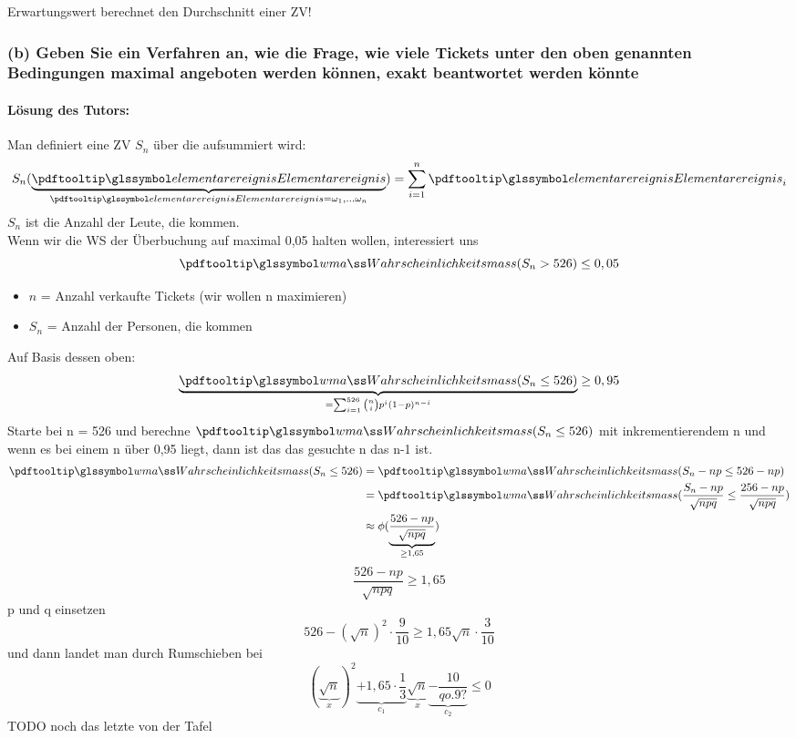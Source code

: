 Erwartungswert berechnet den Durchschnitt einer ZV!

\begin{auf}
    \subsubsection*{(b) Geben Sie ein Verfahren an, wie die Frage, wie viele Tickets unter den oben genannten
    Bedingungen maximal angeboten werden können, exakt beantwortet werden könnte}
    \paragraph{Lösung des Tutors:} Man definiert eine ZV $S_n$ über die aufsummiert wird:
    \[
        S_n( \underbrace{\ele}_{\ele = \omega_1, ... \omega_n}) = \sum^n_{i=1} \ele_i
    \]
    $S_n$ ist die Anzahl der Leute, die kommen. \\
    Wenn wir die WS der Überbuchung auf maximal 0,05 halten wollen, interessiert uns
    \[
        \pe( S_n > 526 ) \leq 0,05
    \]
    \begin{itemize}
        \item $n$ = Anzahl verkaufte Tickets (wir wollen n maximieren)
        \item $S_n$ = Anzahl der Personen, die kommen
    \end{itemize}
    Auf Basis dessen oben:
    \[
        \underbrace{\pe(S_n \leq 526) }_{ = \sum^{526}_{i=1} \binom{n}{i} p^i (1-p)^{n-i}} \geq 0,95
    \]
    Starte bei n = 526 und berechne $\pe(S_n \leq 526)$ mit inkrementierendem n und wenn es bei einem n über 0,95
    liegt, dann ist das das gesuchte n das n-1 ist.
    \begin{align*}
        \pe(S_n \leq 526) & = \pe(S_n - np \leq 526 - np) \\
        & = \pe(\frac{S_n - np}{\sqrt{npq}} \leq \frac{256 - np}{\sqrt{npq}}) \\
        & \approx \phi(\underbrace{\frac{526 - np }{\sqrt{npq}}}_{\geq 1,65})
    \end{align*}
    \[
        \frac{526 - np }{\sqrt{npq}} \geq 1,65
    \]
    p und q einsetzen
    \[
        526 - (\sqrt{n})^2 \cdot \frac{9}{10} \geq 1,65 \sqrt{n} \cdot \frac{3}{10}
    \]
    und dann landet man durch Rumschieben bei
    \[
        ( \underbrace{\sqrt{n}}_{x} )^2  \underbrace{+ 1,65 \cdot \frac{1}{3}}_{c_1} \underbrace{\sqrt{n}}_{x}  \underbrace{- \frac{10}{q o. 9?}}_{c_2} \leq 0
    \]
    TODO noch das letzte von der Tafel
\end{auf}

